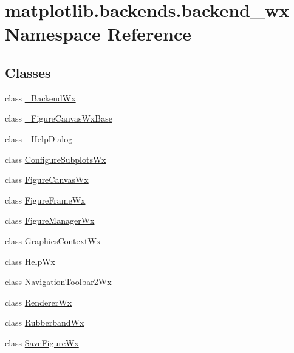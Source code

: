 \hypertarget{namespacematplotlib_1_1backends_1_1backend__wx}{}\section{matplotlib.\+backends.\+backend\+\_\+wx Namespace Reference}
\label{namespacematplotlib_1_1backends_1_1backend__wx}
\subsection*{Classes}
\begin{DoxyCompactItemize}
\item 
class \hyperlink{classmatplotlib_1_1backends_1_1backend__wx_1_1__BackendWx}{\+\_\+\+Backend\+Wx}
\item 
class \hyperlink{classmatplotlib_1_1backends_1_1backend__wx_1_1__FigureCanvasWxBase}{\+\_\+\+Figure\+Canvas\+Wx\+Base}
\item 
class \hyperlink{classmatplotlib_1_1backends_1_1backend__wx_1_1__HelpDialog}{\+\_\+\+Help\+Dialog}
\item 
class \hyperlink{classmatplotlib_1_1backends_1_1backend__wx_1_1ConfigureSubplotsWx}{Configure\+Subplots\+Wx}
\item 
class \hyperlink{classmatplotlib_1_1backends_1_1backend__wx_1_1FigureCanvasWx}{Figure\+Canvas\+Wx}
\item 
class \hyperlink{classmatplotlib_1_1backends_1_1backend__wx_1_1FigureFrameWx}{Figure\+Frame\+Wx}
\item 
class \hyperlink{classmatplotlib_1_1backends_1_1backend__wx_1_1FigureManagerWx}{Figure\+Manager\+Wx}
\item 
class \hyperlink{classmatplotlib_1_1backends_1_1backend__wx_1_1GraphicsContextWx}{Graphics\+Context\+Wx}
\item 
class \hyperlink{classmatplotlib_1_1backends_1_1backend__wx_1_1HelpWx}{Help\+Wx}
\item 
class \hyperlink{classmatplotlib_1_1backends_1_1backend__wx_1_1NavigationToolbar2Wx}{Navigation\+Toolbar2\+Wx}
\item 
class \hyperlink{classmatplotlib_1_1backends_1_1backend__wx_1_1RendererWx}{Renderer\+Wx}
\item 
class \hyperlink{classmatplotlib_1_1backends_1_1backend__wx_1_1RubberbandWx}{Rubberband\+Wx}
\item 
class \hyperlink{classmatplotlib_1_1backends_1_1backend__wx_1_1SaveFigureWx}{Save\+Figure\+Wx}
\item 

\end{DoxyCompactItemize}
